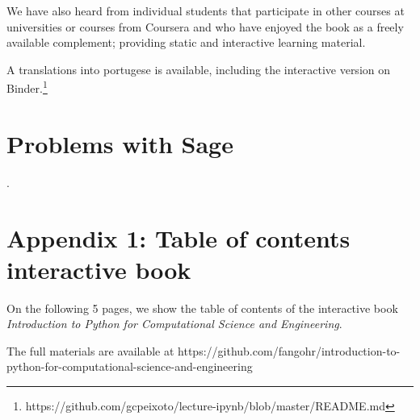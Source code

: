 \documentclass{deliverablereport}
\begin{document}
We have also heard from individual students that participate in other courses
at universities or courses from Coursera and who have enjoyed the book
as a freely available complement; providing static and interactive
learning material.

A translations into portugese is available, including the interactive
version on Binder.\footnote{https://github.com/gcpeixoto/lecture-ipynb/blob/master/README.md}
\pagebreak
\section{Problems with Sage}
.
\pagebreak
\appendix
\section{Appendix 1: Table of contents interactive book}\label{sec:appendix-1}

On the following 5 pages, we show the table of contents of the
interactive book \emph{Introduction to Python for Computational
  Science and Engineering}.

The full materials are available at
\newline
https://github.com/fangohr/introduction-to-python-for-computational-science-and-engineering


\end{document}
